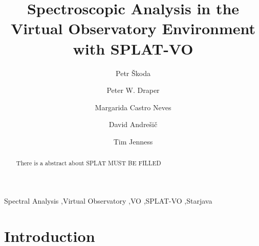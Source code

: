 \documentclass[final,authoryear,5p,times,twocolumn]{elsarticle}
\begin{document}
\begin{frontmatter}

\title{Spectroscopic Analysis in the Virtual Observatory Environment with SPLAT-VO}

\author[OND]{Petr \v{S}koda}
\author[DUR]{Peter W. Draper}
\author[HDB]{Margarida Castro Neves}
\author[VSB]{David Andre\v{s}i\v{c}}
\author[COR]{Tim Jenness}

\address[OND]{Astronomical Institute of the Academy of Sciences,Fri\v{c}ova~298, 251\,65, Ond\v{r}ejov, Czech Republic}
\address[DUR]{Department of Physics, Institute for Computational
Cosmology, University of Durham, South Road, Durham DH1 3LE, UK}
\address[HDB]{Universit\"a{}t Heidelberg, Astronomisches Rechen-Institut,
M\"o{}nchhofstra\ss{}e 12--14, 69120 Heidelberg, Germany}
\address[VSB]{Department of Computer Science, Faculty of Electrical
Engineering and Computer Science, V\v{S}B --- Technical University of Ostrava, 17. listopadu 15, 708 33 Ostrava-Poruba, Czech Republic}
\address[COR]{Department of Astronomy, Cornell University, Ithaca, NY 14853, USA}


\begin{abstract}
There is a abstract about SPLAT
MUST BE FILLED
\end{abstract}
\begin{keyword}
Spectral Analysis \sep Virtual Observatory \sep VO \sep SPLAT-VO \sep Starjava
\end{keyword}
\end{frontmatter}


\newcommand{\qjras}{QJRAS}

\newcommand{\ascl}[1]{\href{http://www.ascl.net/#1}{ascl:#1}}

\section{Introduction}
\end{document}
